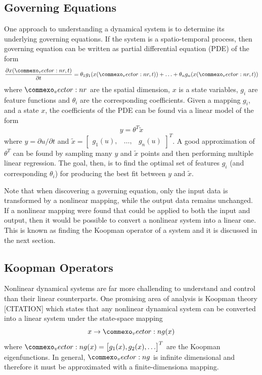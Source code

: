 \documentclass{article}
\renewcommand{\vec}[1]{\vect{#1}}
\begin{document}
\subsection{Governing Equations}
One approach to understanding a dynamical system is to determine its underlying governing equations. If the system is a spatio-temporal process, then governing equation can be written as partial differential equation (PDE) of the form
\begin{equation}
    \frac{\partial x (\vec{r},t)}{\partial t} = \theta_1 g_1(x(\vec{r},t)) + \ldots + \theta_n g_n(x(\vec{r},t))
\end{equation}
where $\vec{r}$ are the spatial dimension, $x$ is a state variables, $g_i$ are feature functions and $\theta_i$ are the corresponding coefficients. Given a mapping $g_i$, and a state $x$, the coefficients of the PDE can be found via a linear model of the form 
\begin{equation}
 y = \theta^T \tilde{x}
 \end{equation}
where $y = \partial u/ \partial t$ and $\tilde{x} = \begin{bmatrix}g_1(u), & \ldots, & g_n(u) \end{bmatrix}^T$. A good approximation of $\theta^T$ can be found by sampling many $y$ and $\tilde{x}$ points and then performing multiple linear regression. The goal, then, is to find the optimal set of features $g_i$ (and corresponding $\theta_i$) for producing the best fit between $y$ and $\tilde{x}$.

Note that when discovering a governing equation, only the input data is transformed by a nonlinear mapping, while the output data remains unchanged. If a nonlinear mapping were found that could be applied to both the input and output, then it would be possible to convert a nonlinear system into a linear one. This is known as finding the Koopman operator of a system and it is discussed in the next section.

\subsection{Koopman Operators}
Nonlinear dynamical systems are far more challending to understand and control than their linear counterparts. One promising area of analysis is Koopman theory [CITATION] which states that any nonlinear dynamical system can be converted into a linear system under the state-space mapping
\begin{equation}
x \rightarrow \vec{g}(x)
\end{equation}
where $\vec{g}(x) = \begin{bmatrix} g_1(x), g_2(x), \hdots \end{bmatrix}^T$ are the Koopman eigenfunctions. In general, $\vec{g}$ is infinite dimensional and therefore it must be approximated with a finite-dimensiona mapping.
\end{document}
